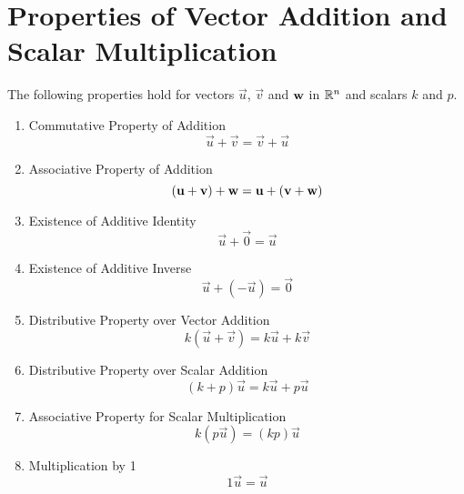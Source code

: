 \documentclass{ximera}
\begin{document}
\begin{image}[4.5in]
\end{image}
\section*{Properties of Vector Addition and Scalar Multiplication}
  \begin{theorem}\label{th:vecproperties} The following properties hold for vectors $\vec{u}$, $\vec{v}$ and ${\bf w}$ in $\RR^n$ and scalars $k$ and $p$.
  \begin{enumerate}
  \item \label{item:commvectoradd}
  Commutative Property of Addition
  $$\vec{u}+\vec{v}=\vec{v}+\vec{u}$$
  \item \label{item:assocvectoradd}
  Associative Property of Addition
  $$(\vec{u}+\vec{v})+{\bf w}=\vec{u}+(\vec{v}+{\bf w})$$
  \item \label{item:identityvectoradd}
  Existence of Additive Identity
  $$\vec{u}+\vec{0}=\vec{u}$$
  \item \label{item:inversevectoradd}
  Existence of Additive Inverse
  $$\vec{u}+(-\vec{u})=\vec{0}$$
  \item\label{item:distvectoradd}
  Distributive Property over Vector Addition
  $$k(\vec{u}+\vec{v})=k\vec{u}+k\vec{v}$$
  \item\label{item:distvectoradd2}
  Distributive Property over Scalar Addition
  $$(k+p)\vec{u}=k\vec{u}+p\vec{u}$$
  \item \label{item:assocvectorscalarmult}
  Associative Property for Scalar Multiplication
  $$k(p\vec{u})=(kp)\vec{u}$$
  \item \label{item:onevectorscalarmult}
  Multiplication by 1
  $$1\vec{u}=\vec{u}$$
  \end{enumerate}
\end{theorem}
\end{document}
